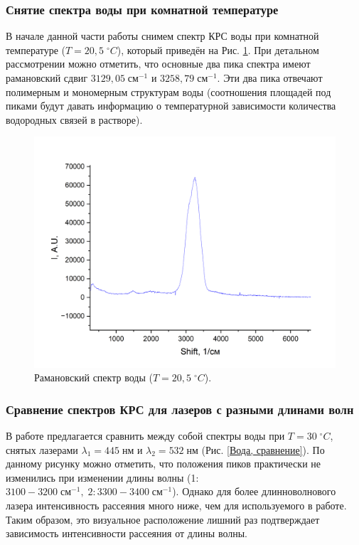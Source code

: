 \documentclass{article}
\begin{document}
\subsubsection{Снятие спектра воды при комнатной температуре}\;

\par В начале данной части работы снимем спектр КРС воды при комнатной температуре ($T = 20,5 \; ^{\circ}C$), который приведён на Рис. \ref{Вода, комната}. При детальном рассмотрении можно отметить, что основные два пика спектра имеют рамановский сдвиг $3129,05\; \text{см}^{-1}$ и $3258,79\; \text{см}^{-1}$. Эти два пика отвечают полимерным и мономерным структурам воды (соотношения площадей под пиками будут давать информацию о температурной зависимости количества водородных связей в растворе).

\begin{figure}[h!]
\centering
    \includegraphics[width=0.6\linewidth]{Images/Вода; комнатная температура.png}
    \caption{Рамановский спектр воды ($T = 20,5 \; ^{\circ}C$).}
    \label{Вода, комната}
\end{figure}


\subsubsection{Сравнение спектров КРС для лазеров с разными длинами волн}\;

\par В работе предлагается сравнить между собой спектры воды при $T = 30 \; ^{\circ}C$, снятых лазерами $\lambda_1 = 445 \; \text{нм}$ и $\lambda_2 = 532 \; \text{нм}$ (Рис. \ref{Вода, сравнение}). По данному рисунку можно отметить, что положения пиков практически не изменились при изменении длины волны (1: $3100 - 3200 \; \text{см}^{-1}, \; 2: 3300 - 3400 \; \text{см}^{-1}$). Однако для более длинноволнового лазера интенсивность рассеяния много ниже, чем для используемого в работе. Таким образом, это визуальное расположение лишний раз подтверждает зависимость интенсивности рассеяния от длины волны.
\end{document}
